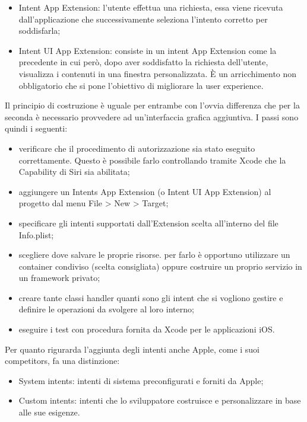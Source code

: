 		\begin{itemize}
			\item Intent App Extension: l’utente effettua una richiesta, essa viene ricevuta dall’applicazione che successivamente seleziona l’intento corretto per soddisfarla;
			\item Intent UI App Extension: consiste in un intent App Extension come la precedente in cui però, dopo aver soddisfatto la richiesta dell’utente, visualizza i contenuti in una finestra personalizzata. È un arricchimento non obbligatorio che si pone l’obiettivo di migliorare la user experience.
		\end{itemize}
		Il principio di costruzione è uguale per entrambe con l'ovvia differenza che per la seconda è necessario provvedere ad un'interfaccia grafica aggiuntiva. I passi sono quindi i seguenti:
		\begin{itemize}
			\item verificare che il procedimento di autorizzazione sia stato eseguito correttamente. Questo è possibile farlo controllando tramite Xcode che la Capability di Siri sia abilitata;
			\item aggiungere un Intents App Extension (o Intent UI App Extension) al progetto dal menu File > New > Target;
			\item specificare gli intenti supportati dall’Extension scelta all’interno del file Info.plist;
			\item scegliere dove salvare le proprie risorse. per farlo è opportuno utilizzare un container condiviso (scelta consigliata) oppure costruire un proprio servizio in un framework privato;
			\item creare tante classi handler quanti sono gli intent che si vogliono gestire e definire le operazioni da svolgere al loro interno;
			\item eseguire i test con procedura fornita da Xcode per le applicazioni iOS.
		\end{itemize}
		Per quanto rigurarda l'aggiunta degli intenti anche Apple, come i suoi competitors, fa una distinzione:
		\begin{itemize}
			\item System intents: intenti di sistema preconfigurati e forniti da Apple;
			\item Custom intents: intenti che lo sviluppatore costruisce e personalizzare in base alle sue esigenze.
		\end{itemize}


